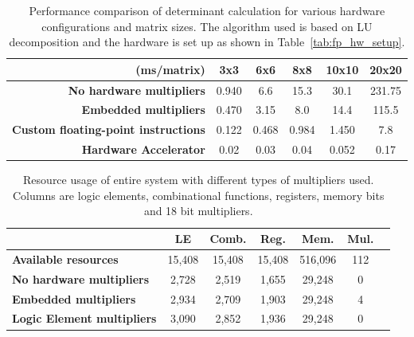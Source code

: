 \documentclass[]{article}
\begin{document}
\begin{table}[p]
	\caption{Performance comparison of determinant calculation for various hardware configurations and matrix sizes. The algorithm used is based on LU decomposition and the hardware is set up as shown in Table~\ref{tab:fp_hw_setup}.}
	\label{tab:sw_perf}
	\begin{center}
		\begin{tabular}{r|ccccc}
		\hline

		\hline
			(ms/matrix)
			& \textbf{3x3}	& \textbf{6x6}	& \textbf{8x8}	& \textbf{10x10}	& \textbf{20x20} \\ 
		\hline
			\textbf{No hardware multipliers}
			& 0.940			& 6.6			& 15.3			& 30.1				& 231.75 \\
			\textbf{Embedded multipliers}
			& 0.470			& 3.15			& 8.0			& 14.4				& 115.5 \\
			\textbf{Custom floating-point instructions}
			& 0.122			& 0.468			& 0.984			& 1.450				& 7.8 \\
			\textbf{Hardware Accelerator}
			& 0.02 			& 0.03 			& 0.04 			& 0.052 			& 0.17 \\
		\hline

		\hline
		\end{tabular}
	\end{center}
\end{table}

\begin{table}[p]
	\caption{Resource usage of entire system with different types of multipliers used. Columns are logic elements, combinational functions, registers, memory bits and 18 bit multipliers.}
	\label{tab:sw_resourceuse}
	\begin{center}
		\begin{tabular}{l|cccccc}
		\hline

		\hline
			& \textbf{LE} 	& \textbf{Comb.} 	& \textbf{Reg.} 	& \textbf{Mem.} 	& \textbf{Mul.} \\

		\hline
			\textbf{Available resources}
			& 15,408 	& 15,408 	& 15,408	& 516,096 	& 112 \\
			\textbf{No hardware multipliers}
			& 2,728 	& 2,519 	& 1,655 	& 29,248 	& 0 \\
			\textbf{Embedded multipliers}
			& 2,934		& 2,709		& 1,903		& 29,248	& 4 \\
			\textbf{Logic Element multipliers}
			& 3,090		& 2,852		& 1,936		& 29,248	& 0 \\
		\hline

		\hline
		\end{tabular}
	\end{center}
\end{table}
\end{document}
